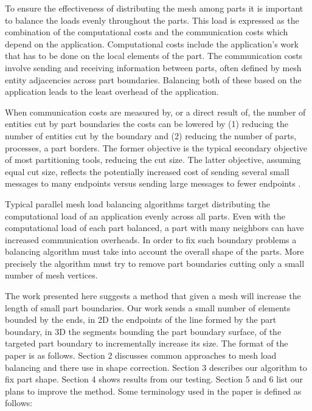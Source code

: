 \documentclass{thesis}
\begin{document}
To ensure the effectiveness of distributing the mesh among parts it is 
important to balance the loads evenly throughout the parts. This load is 
expressed as the combination of the computational costs and the communication 
costs which depend on the application. Computational costs include the 
application's work that has to be done on the local elements of the part. The 
communication costs involve sending and receiving information between parts, 
often defined by mesh entity adjacencies across part boundaries. Balancing 
both of these based on the application leads to the least overhead of the 
application.

When communication costs are measured by, or a direct result of, the number 
of entities cut by part boundaries the costs can be lowered by (1) reducing 
the number of entities cut by the boundary and (2) reducing the number of 
parts, processes, a part borders.  The former objective is the typical 
secondary objective of most partitioning tools, reducing the cut size.  The 
latter objective, assuming equal cut size, reflects the potentially increased 
cost of sending several small messages to many endpoints versus sending large 
messages to fewer endpoints \cite{MPIpresent,MPImessage}.

Typical parallel mesh load balancing algorithms target distributing the 
computational load of an application evenly across all parts. Even with the 
computational load of each part balanced, a part with many neighbors can have 
increased communication overheads. In order to fix such boundary problems a 
balancing algorithm must take into account the overall shape of the parts. 
More precisely the algorithm must try to remove part boundaries cutting only a 
small number of mesh vertices.

The work presented here suggests a method that given a mesh will 
increase the length of small part boundaries. Our work 
sends a small number of elements bounded by the ends, in 2D the endpoints of 
the line formed by the part boundary, in 3D the segments bounding the part 
boundary surface, of the targeted part boundary to incrementally increase its 
size. The format of the paper is as follows. Section 2 
discusses common approaches to mesh load balancing and there use in shape 
correction. Section 3 describes our algorithm to fix part shape. Section 4 
shows results from our testing. Section 5 and 6 list our plans to improve the 
method. Some terminology used in the paper is defined as follows:
\end{document}
